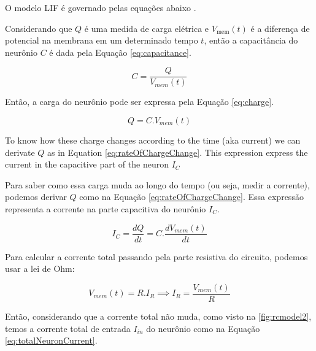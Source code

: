 			\par O modelo LIF é governado pelas equações abaixo \cite{10242251}.
			
			\par Considerando que $Q$ é uma medida de carga elétrica e $V_{\text{mem}}(t)$ é a diferença de potencial na membrana em um determinado tempo $t$, então a capacitância do neurônio $C$ é dada pela Equação \autoref{eq:capacitance}.
			
			\begin{equation}
				\label{eq:capacitance}
				C = \frac{Q}{V_{mem}(t)}
			\end{equation}
			
			\par Então, a carga do neurônio pode ser expressa pela Equação \autoref{eq:charge}.
			
			\begin{equation}
				\label{eq:charge}
				Q = C.V_{mem}(t)
			\end{equation}
			
			\par To know how these charge changes according to the time (aka current) we can derivate $Q$ as in Equation \autoref{eq:rateOfChargeChange}. This expression express the current in the capacitive part of the neuron $I_C$
			
			\par Para saber como essa carga muda ao longo do tempo (ou seja, medir a corrente), podemos derivar $Q$ como na Equação \autoref{eq:rateOfChargeChange}. Essa expressão representa a corrente na parte capacitiva do neurônio $I_C$.
			
			\begin{equation}
				\label{eq:rateOfChargeChange}
				I_C = \dfrac{dQ}{dt} = C. \dfrac{dV_{mem}(t)}{dt}
			\end{equation}
			
			\par Para calcular a corrente total passando pela parte resistiva do circuito, podemos usar a lei de Ohm:
			
			\begin{equation}
				\label{eq:ohmlaw}
				V_{mem}(t) = R.I_R \implies I_R = \frac{V_{mem}(t)}{R}
			\end{equation}
			
			\par Então, considerando que a corrente total não muda, como visto na  \autoref{fig:rcmodel2}, temos a corrente total de entrada $I_{in}$ do neurônio como na Equação \autoref{eq:totalNeuronCurrent}.
			
